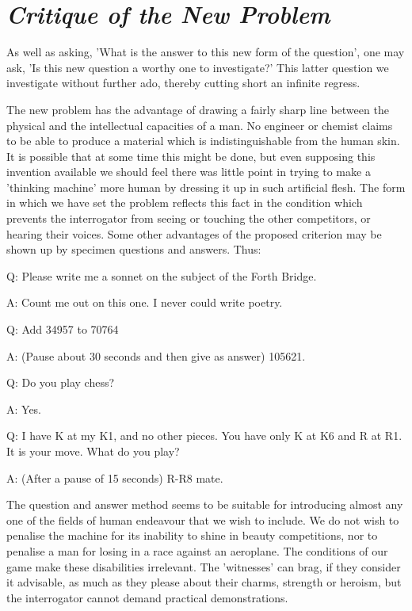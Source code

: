     \section{\textit{Critique of the New Problem}}
    
    As well as asking, 'What is the answer to this new form of the question', one may ask, 'Is this new question a worthy one to investigate?' This latter question we investigate without further ado, thereby cutting short an infinite regress.

    The new problem has the advantage of drawing a fairly sharp line between the physical and the intellectual capacities of a man. No engineer or chemist claims to be able to produce a material which is indistinguishable from the human skin. It is possible that at some time this might be done, but even supposing this invention available we should feel there was little point in trying to make a 'thinking machine' more human by dressing it up in such artificial flesh. The form in which we have set the problem reflects this fact in the condition which prevents the interrogator from seeing or touching the other competitors, or hearing their voices. Some other advantages of the proposed criterion may be shown up by specimen questions and answers. Thus:
    \vspace{\baselineskip}

    Q: Please write me a sonnet on the subject of the Forth Bridge.

    A: Count me out on this one. I never could write poetry.

    Q: Add 34957 to 70764

    A: (Pause about 30 seconds and then give as answer) 105621.

    Q: Do you play chess?

    A: Yes.

    Q: I have K at my K1, and no other pieces. You have only K at K6 and R at R1. It is your move. What do you play?

    A: (After a pause of 15 seconds) R-R8 mate.

    \vspace{\baselineskip}
    The question and answer method seems to be suitable for introducing almost any one of the fields of human endeavour that we wish to include. We do not wish to penalise the machine for its inability to shine in beauty competitions, nor to penalise a man for losing in a race against an aeroplane. The conditions of our game make these disabilities irrelevant. The 'witnesses' can brag, if they consider it advisable, as much as they please about their charms, strength or heroism, but the interrogator cannot demand practical demonstrations.

